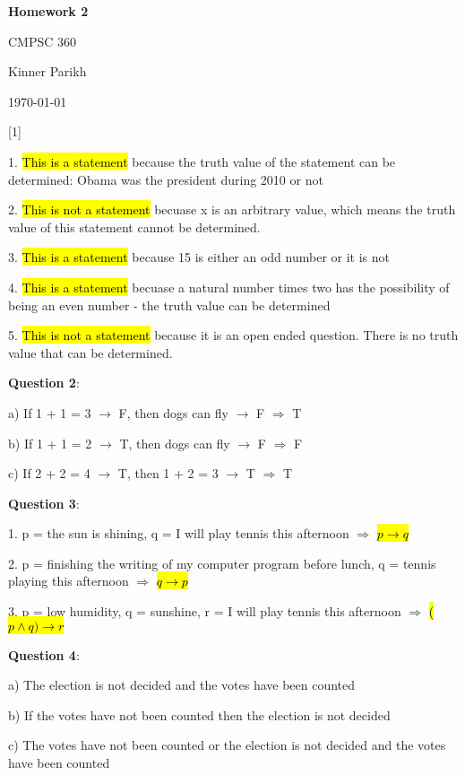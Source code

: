 \documentclass{article} %
\newcommand{\question}[2][]{\begin{flushleft}
        \textbf{Question #1}: \textit{#2}

\end{flushleft}}
\newcommand{\maketitletwo}[2][]{\begin{center}
        \Large{\textbf{Homework #1}
            
            CMPSC 360} %
        \vspace{5pt}
        
        \normalsize{Kinner Parikh  %
        
        \today}        %
        \vspace{15pt}
        
\end{center}}
\begin{document}
    \maketitletwo[2]  %
    
    \question[1]{}
    
        1. \hl{This is a statement} because the truth value of the statement can be determined: Obama was \tabto{1cm} the president during 2010 or not

        2. \hl{This is not a statement} becuase x is an arbitrary value, which means the truth value of this \tabto{1cm} statement cannot be determined.

        3. \hl{This is a statement} because 15 is either an odd number or it is not

        4. \hl{This is a statement} becuase a natural number times two has the possibility of being an even \tabto{1cm} number - the truth value can be determined

        5. \hl{This is not a statement} because it is an open ended question. There is no truth value that \tabto{1cm} can be determined.

    \question[2]{}

        a) If 1 + 1 = 3 $\rightarrow$ F, then dogs can fly $\rightarrow$ F $\Rightarrow$  T

        b) If 1 + 1 = 2 $\rightarrow$ T, then dogs can fly $\rightarrow$ F $\Rightarrow$  F

        c) If 2 + 2 = 4 $\rightarrow$ T, then 1 + 2 = 3 $\rightarrow$ T $\Rightarrow$ T

    \question[3]{}

        1. p = the sun is shining, q = I will play tennis this afternoon $\Rightarrow$ \hl{$p \rightarrow q$}

        2. p = finishing the writing of my computer program before lunch, q = tennis playing this \tabto{0.96cm} afternoon $\Rightarrow$ \hl{$q \rightarrow p$}

        3. p = low humidity, q = sunshine, r = I will play tennis this afternoon $\Rightarrow$ \hl{($p \land q) \rightarrow r$}
    
    \question[4]{}

        a) The election is not decided and the votes have been counted

        b) If the votes have not been counted then the election is not decided

        c) The votes have not been counted or the election is not decided and the votes have \tabto{0.98cm} been counted
\end{document}
